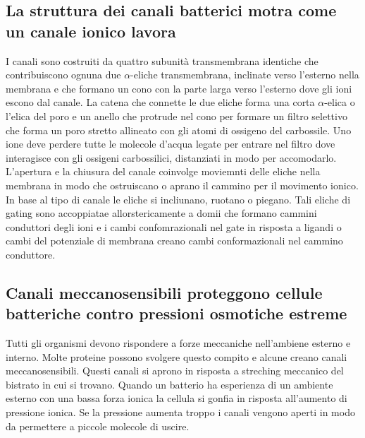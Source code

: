 \subsection{La struttura dei canali batterici  motra come un canale ionico lavora}
I canali sono costruiti da quattro subunit\`a transmembrana identiche che contribuiscono ognuna due $\alpha$-eliche transmembrana, inclinate verso l'esterno nella membrana e che formano 
un cono con la parte larga verso l'esterno dove gli ioni  escono dal canale. La catena che connette le due eliche forma una corta $\alpha$-elica o l'elica del poro e un 
anello che protrude nel cono per formare un filtro selettivo che forma un poro stretto allineato con gli atomi di ossigeno del carbossile. Uno ione  deve perdere tutte le molecole
d'acqua legate per entrare nel filtro dove interagisce con gli ossigeni carbossilici, distanziati in modo per accomodarlo. L'apertura e la chiusura del canale coinvolge moviemnti delle
eliche nella membrana in modo che ostruiscano o aprano il cammino per il movimento ionico. In base al tipo di canale le eliche si incliunano, ruotano o piegano. Tali eliche di gating
sono accoppiatae allorstericamente a domii che formano cammini conduttori degli ioni  e i cambi confomrazionali nel gate in risposta a ligandi o cambi del potenziale di membrana 
creano cambi conformazionali nel cammino conduttore.
\subsection{Canali meccanosensibili proteggono cellule batteriche contro pressioni osmotiche estreme}
Tutti gli organismi devono rispondere a forze meccaniche nell'ambiene esterno e interno. Molte proteine possono svolgere questo compito e alcune creano canali meccanosensibili. 
Questi canali si aprono in risposta a streching meccanico del bistrato in cui si trovano. Quando un batterio ha esperienza di un ambiente esterno con una bassa forza ionica la cellula si
gonfia in risposta all'aumento di pressione ionica. Se la pressione aumenta troppo i canali vengono aperti in modo da permettere a piccole molecole di uscire. 
